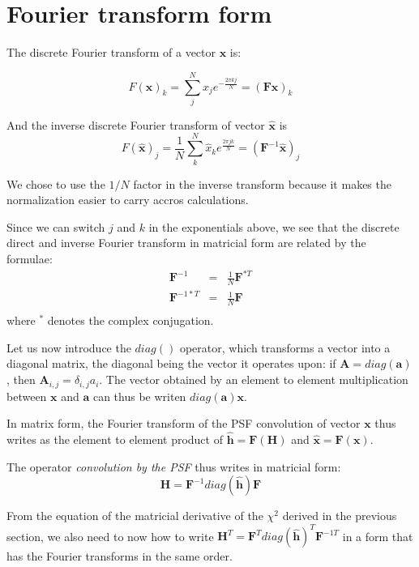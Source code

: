 \documentclass[12pt]{article}
\newcommand{\psf}{\mathbf{H}}
\newcommand{\hhat}{\mathbf{\hat h}}
\newcommand{\x}{\mathbf{x}}
\newcommand{\xhat}{\mathbf{\hat x}}
\newcommand{\A}{\mathbf{A}}
\newcommand{\avect}{\mathbf{a}}
\newcommand{\F}{\mathbf{F}}
\begin{document}
\section{Fourier transform form}

The discrete Fourier transform of a vector $\x$ is:

\begin{equation}
  \label{eq:7}
  F(\x)_{k} = \sum_{j}^{N} x_{j} e^{- \frac{2\pi k j}{N}} = (\F \x)_{k}
\end{equation}

And the inverse discrete Fourier transform of vector $\xhat$ is
\begin{equation}
  \label{eq:8}
  F(\xhat)_{j} = \frac{1}{N} \sum_{k}^{N} \hat x_{k} e^{ \frac{2\pi j k}{N}} =
  (\F^{-1} \xhat)_{j}
\end{equation}

We chose to use the $1/N$ factor in the inverse transform because it makes the
normalization easier to carry accros calculations.

Since we can switch $j$ and $k$ in the exponentials above, we see that the
discrete direct and inverse Fourier transform in matricial form are related by
the formulae:
\begin{eqnarray*}
  \label{eq:9}
  \F^{-1} & = &\frac{1}{N} \F^{*T} \\
  \F^{-1*T} & = &\frac{1}{N} \F \\
\end{eqnarray*}
where $^{*}$ denotes the complex conjugation.


Let us now introduce the $diag()$ operator, which transforms a vector into a
diagonal matrix, the diagonal being the vector it operates upon: if $\A =
diag(\avect)$, then $\A_{i,j} = \delta_{i,j} a_{i}$. The vector obtained by an
element to element multiplication between $\x$ and $\avect$ can thus be writen
$diag(\avect) \x$.

In matrix form, the Fourier transform of the PSF convolution of vector $\x$ thus
writes as the element to element product of $\hhat = \F(\psf)$ and $\xhat =
\F(\x)$. 

The operator \emph{convolution by the PSF} thus writes in matricial form:
\begin{equation}
  \label{eq:11}
  \psf = \F^{-1} diag(\hhat) \F
\end{equation}

From the equation of the matricial derivative of the $\chi^{2}$ derived in the
previous section, we also need to now how to write $\psf^{T} = \F^{T}
diag(\hhat)^{T} \F^{-1T}$ in a form that has the Fourier transforms in the same
order. 
\end{document}

